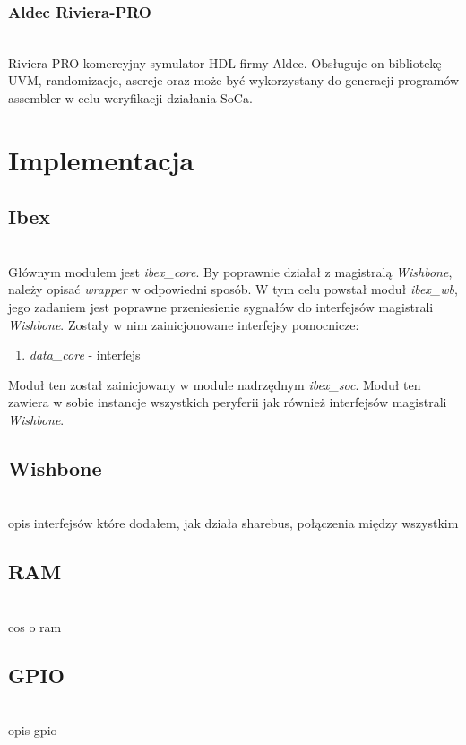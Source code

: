 \documentclass[11pt,a4paper]{article}
\begin{document}
			\subsubsection{Aldec Riviera-PRO}
			\hspace{5mm}
				\\Riviera-PRO komercyjny symulator HDL firmy Aldec. Obsługuje on bibliotekę UVM, randomizacje, asercje oraz może być wykorzystany do generacji programów assembler w celu weryfikacji działania SoCa.
				
\newpage

\section{Implementacja}

	\subsection{Ibex}
	\hspace{5mm}
		\\Głównym modułem jest \textit{ibex\_core}. By poprawnie działał z magistralą \textit{Wishbone}, należy opisać \textit{wrapper} w odpowiedni sposób. W tym celu powstał moduł \textit{ibex\_wb}, jego zadaniem jest poprawne przeniesienie sygnałów do interfejsów magistrali \textit{Wishbone}. Zostały w nim zainicjonowane interfejsy pomocnicze:
\begin{enumerate}
	\item \textit{data_core} - interfejs 
\end{enumerate}		
		 Moduł ten został zainicjowany w module nadrzędnym \textit{ibex\_soc}. Moduł ten zawiera w sobie instancje wszystkich peryferii jak również interfejsów magistrali \textit{Wishbone}.

	\subsection{Wishbone}
	\hspace{5mm}
		\\opis interfejsów które dodałem, jak działa sharebus, połączenia między wszystkim
		
	\subsection{RAM}
	\hspace{5mm}
		\\cos o ram

	\subsection{GPIO}
	\hspace{5mm}
		\\opis gpio
\end{document}
